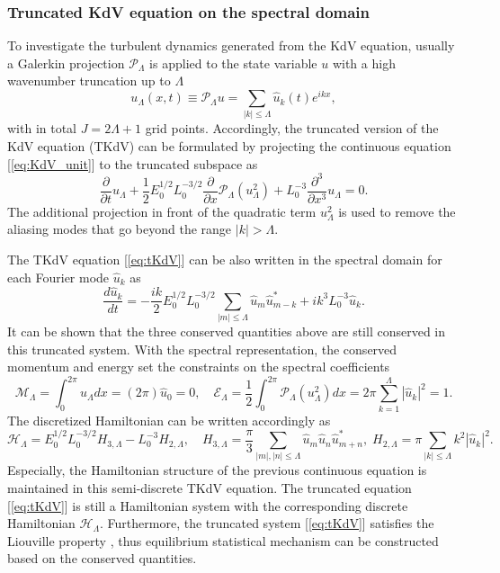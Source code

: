 \documentclass[9pt,twoside,lineno]{pnas-new}
\theoremstyle{plain}
\theoremstyle{plain}
\begin{document}
\subsubsection*{Truncated KdV equation on the spectral domain}

To investigate the turbulent dynamics generated from the KdV equation,
usually a Galerkin projection $\mathcal{P}_{\Lambda}$ is applied
to the state variable $u$ with a high wavenumber truncation up to
$\Lambda$
\begin{equation}
u_{\Lambda}\left(x,t\right)\equiv\mathcal{P}_{\Lambda}u=\sum_{\left|k\right|\leq\Lambda}\hat{u}_{k}\left(t\right)e^{ikx},\label{eq:trunc_u}
\end{equation}
with in total $J=2\Lambda+1$ grid points. Accordingly,
the truncated version of the KdV equation (TKdV) can be formulated
by projecting the continuous equation [\ref{eq:KdV_unit}] to the
truncated subspace as
\begin{equation}
\frac{\partial}{\partial t}u_{\Lambda}+\frac{1}{2}E_{0}^{1/2}L_{0}^{-3/2}\frac{\partial}{\partial x}\mathcal{P}_{\Lambda}\left(u_{\Lambda}^{2}\right)+L_{0}^{-3}\frac{\partial^{3}}{\partial x^{3}}u_{\Lambda}=0.\label{eq:tKdV}
\end{equation}
The additional projection in front of the quadratic term $u_{\Lambda}^{2}$
is used to remove the aliasing modes that go beyond the range $\left|k\right|>\Lambda$.

The TKdV equation [\ref{eq:tKdV}] can be also written in the spectral
domain for each Fourier mode $\hat{u}_{k}$ as
\[
\frac{d\hat{u}_{k}}{dt}=-\frac{ik}{2}E_{0}^{1/2}L_{0}^{-3/2}\sum_{\left|m\right|\leq\Lambda}\hat{u}_{m}\hat{u}_{m-k}^{*}+ik^{3}L_{0}^{-3}\hat{u}_{k}.
\]
It can be shown that the three conserved quantities above are still
conserved in this truncated system. With the spectral representation,
the conserved momentum and energy set the constraints on the spectral
coefficients 
\[
\mathcal{M}_{\Lambda}=\int_{0}^{2\pi}u_{\Lambda}dx=\left(2\pi\right)\hat{u}_{0}=0,\quad\mathcal{E}_{\Lambda}=\frac{1}{2}\int_{0}^{2\pi}\mathcal{P}_{\Lambda}\left(u_{\Lambda}^{2}\right)dx=2\pi\sum_{k=1}^{\Lambda}\left|\hat{u}_{k}\right|^{2}=1.
\]
The discretized Hamiltonian can be written accordingly as
\[
\mathcal{H}_{\Lambda}=E_{0}^{1/2}L_{0}^{-3/2}H_{3,\Lambda}-L_{0}^{-3}H_{2,\Lambda},\quad H_{3,\Lambda}=\frac{\pi}{3}\sum_{\left|m\right|,\left|n\right|\leq\Lambda}\hat{u}_{m}\hat{u}_{n}\hat{u}_{m+n}^{*},\;H_{2,\Lambda}=\pi\sum_{\left|k\right|\leq\Lambda}k^{2}\left|\hat{u}_{k}\right|^{2}.
\]
Especially, the Hamiltonian structure of the previous continuous equation
is maintained in this semi-discrete TKdV equation. The truncated equation
[\ref{eq:tKdV}] is still a Hamiltonian system with the corresponding
discrete Hamiltonian $\mathcal{H}_{\Lambda}$. Furthermore, the truncated
system [\ref{eq:tKdV}] satisfies the Liouville property \cite{abramov2003hamiltonian,majda2006nonlinear},
thus equilibrium statistical mechanism can be constructed based on
the conserved quantities.
\end{document}
